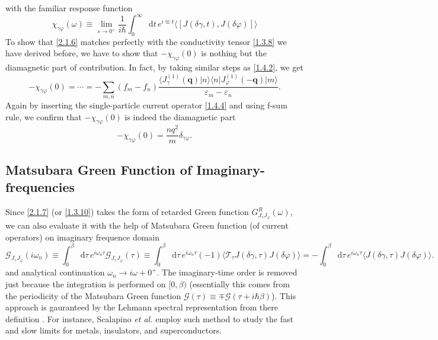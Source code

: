 \documentclass[10pt,nofootinbib,letterpaper]{revtex4}
\newcommand*\dd{\mathop{}\!\mathrm{d}}
\begin{document}
		with the familiar response function
		\begin{equation}\label{2.1.7}
			\chi_{\gamma\varphi}(\omega)\equiv\lim_{s \rightarrow0^+}\dfrac{1}{i\hbar}\int_0^\infty\dd t\, e^{i\varpi t}\langle[J(\delta\gamma,t),J(\delta\varphi)]\rangle
		\end{equation}
		To show that \eqref{2.1.6} matches perfectly with the conductivity tensor \eqref{1.3.8} we have derived before, we have to show that $-\chi_{\gamma\varphi}(0)$ is nothing but the diamagnetic part of contribution. In fact, by taking similar steps as \eqref{1.4.2}, we get
		\begin{equation}\label{2.1.8}
			-\chi_{\gamma\varphi}(0)=\cdots=-\sum_{m,n}(f_m-f_n)\dfrac{\langle J_\gamma^{(1)}(\bm{q})|n\rangle\langle n|J_\varphi^{(1)}(\bm{-q})|m\rangle}{\varepsilon_m-\varepsilon_n}.
		\end{equation}
		Again by inserting the single-particle current operator \eqref{1.4.4} and using f-sum rule, we confirm that $-\chi_{\gamma\varphi}(0)$ is indeed the diamagnetic part
		\begin{equation}\label{2.1.8}
			-\chi_{\gamma\varphi}(0)=\dfrac{nq^2}{m}\delta_{\gamma\varphi}.
		\end{equation}
	\subsection{Matsubara Green Function of Imaginary-frequencies}
		Since \eqref{2.1.7} (or \eqref{1.3.10}) takes the form of retarded Green function $G^R_{J_\gamma J_\varphi}(\omega)$, we can also evaluate it with the help of Matsubara Green function (of current operators) on imaginary frequence domain
		\begin{equation*}
			\mathcal{G}_{J_\gamma J_\varphi}(i\omega_n)\equiv\int_0^\beta\dd\tau\,e^{i\omega_n\tau}\mathcal{G}_{J_\gamma J_\varphi}(\tau)\equiv\int_0^\beta\dd\tau\,e^{i\omega_n\tau}(-1)\langle\mathcal{T}_\tau J(\delta\gamma,\tau) J(\delta\varphi)\rangle=-\int_0^\beta\dd\tau\,e^{i\omega_n\tau}\langle J(\delta\gamma,\tau) J(\delta\varphi)\rangle.
		\end{equation*}
		and analytical continuation $\omega_n \rightarrow i\omega+0^+$. The imaginary-time order is removed just because the integration is performed on $[0,\beta)$ (essentially this comes from the periodicity of the Matsubara Green function $\mathcal{G}(\tau)\equiv\mp\mathcal{G}(\tau+i\hbar\beta)$). This approach is gauranteed by the Lehmann spectral representation from there definition \cite{mahanmany}. For instance, Scalapino \textit{et al.} \cite{scalapino1993insulator} employ such method to study the fast and slow limits for metals, insulators, and superconductors.
\end{document}
